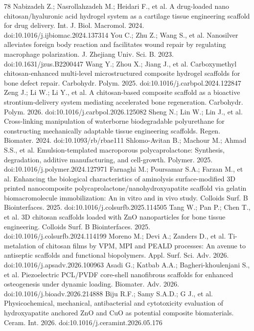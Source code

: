 \documentclass[5p,times,twocolumn]{elsarticle}
\begin{document}
\begin{thebibliography}{78}
 Nabizadeh Z.; Nasrollahzadeh M.; Heidari F., et al. A drug-loaded nano chitosan/hyaluronic acid hydrogel system as a cartilage tissue engineering scaffold for drug delivery. Int. J. Biol. Macromol. 2024. doi:10.1016/j.ijbiomac.2024.137314
 You C.; Zhu Z.; Wang S., et al. Nanosilver alleviates foreign body reaction and facilitates wound repair by regulating macrophage polarization. J. Zhejiang Univ. Sci. B. 2023. doi:10.1631/jzus.B2200447
 Wang Y.; Zhou X.; Jiang J., et al. Carboxymethyl chitosan-enhanced multi-level microstructured composite hydrogel scaffolds for bone defect repair. Carbohydr. Polym. 2025. doi:10.1016/j.carbpol.2024.122847
 Zeng J.; Li W.; Li Y., et al. A chitosan-based composite scaffold as a bioactive strontium-delivery system mediating accelerated bone regeneration. Carbohydr. Polym. 2026. doi:10.1016/j.carbpol.2026.125082
 Sheng N.; Lin W.; Lin J., et al. Cross-linking manipulation of waterborne biodegradable polyurethane for constructing mechanically adaptable tissue engineering scaffolds. Regen. Biomater. 2024. doi:10.1093/rb/rbae111
 Shlomo-Avitan B.; Machour M.; Ahmad S.S., et al. Emulsion-templated macroporous polycaprolactone: Synthesis, degradation, additive manufacturing, and cell-growth. Polymer. 2025. doi:10.1016/j.polymer.2024.127971
 Farnaghi M.; Poursamar S.A.; Farzan M., et al. Enhancing the biological characteristics of aminolysis surface-modified 3D printed nanocomposite polycaprolactone/nanohydroxyapatite scaffold via gelatin biomacromolecule immobilization: An in vitro and in vivo study. Colloids Surf. B Biointerfaces. 2025. doi:10.1016/j.colsurfb.2025.114505
 Tang W.; Pan P.; Chen T., et al. 3D chitosan scaffolds loaded with ZnO nanoparticles for bone tissue engineering. Colloids Surf. B Biointerfaces. 2025. doi:10.1016/j.colsurfb.2024.114199
 Moreno M.; Devi A.; Zanders D., et al. Ti-metalation of chitosan films by VPM, MPI and PEALD processes: An avenue to antiseptic scaffolds and functional biopolymers. Appl. Surf. Sci. Adv. 2026. doi:10.1016/j.apsadv.2026.100963
 Asadi G.; Katbab A.A.; Bagheri-khoulenjani S., et al. Piezoelectric PCL/PVDF core-shell nanofibrous scaffolds for enhanced osteogenesis under dynamic loading. Biomater. Adv. 2026. doi:10.1016/j.bioadv.2026.214888
 Biju R.F.; Samy S.A.D.; G J., et al. Physicochemical, mechanical, antibacterial and cytotoxicity evaluation of hydroxyapatite anchored ZnO and CuO as potential composite biomaterials. Ceram. Int. 2026. doi:10.1016/j.ceramint.2026.05.176

\end{thebibliography}
\end{document}
